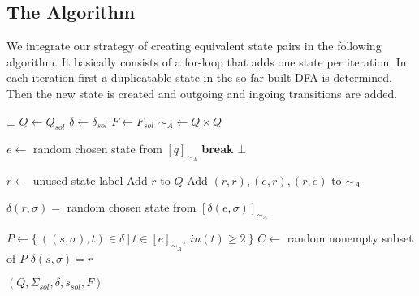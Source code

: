 \subsection{The Algorithm}

We integrate our strategy of creating equivalent state pairs in the following algorithm. It basically consists of a for-loop that adds one state per iteration. In each iteration first a duplicatable state in the so-far built DFA is determined. Then the new state is created and outgoing and ingoing transitions are added.

\vspace{0.2cm}
\begin{spacing}{1}
\begin{algorithmic}[1]
		\State \Return $\bot$
	\EndIf
    \State $Q \gets Q_{sol}$
    \State $\delta \gets \delta_{sol}$
    \State $F \gets F_{sol}$
    \State $\sim_A \gets Q\times Q$
	
	\vspace{0.2cm}
	
    
    	\vspace{0.2cm}
    
		 
				\State $e \gets$ random chosen state from $[q]_{\sim_A}$
				\State \textbf{break}
			\EndIf
		\EndFor
		 \Return $\bot$ \EndIf
		
		\vspace{0.2cm}
		
		\State $r \gets$ unused state label 
        \State Add $r$ to $Q$
		\State Add $(r,r), (e,r), (r,e)$ to $\sim_A$
		
		\vspace{0.2cm}
		
		 
			\State $\delta(r, \sigma) =$ random chosen state from $[\delta(e, \sigma)]_{\sim_A}$
		\EndFor
		
		\vspace{0.2cm}
		
		\State $P \gets \{\ ((s, \sigma), t) \in \delta\ |\ t \in [e]_{\sim_A},\ in(t) \geq 2\ \}$ 
		\State $C \gets$ random nonempty subset of $P$
            \State $\delta(s, \sigma) = r$
		\EndFor
		
		\vspace{0.2cm}
		
	\EndFor
    \State \Return $(Q, \Sigma_{sol}, \delta, s_{sol}, F)$
	\EndFunction
\end{algorithmic}
\end{spacing}
